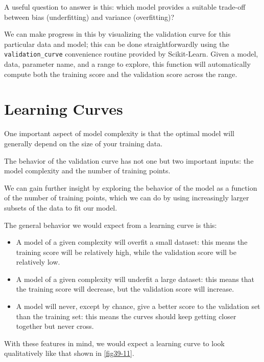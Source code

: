 A useful question to answer is this: which model provides a suitable trade-off between bias (underfitting) and
variance (overfitting)?

We can make progress in this by visualizing the validation curve for this particular
data and model; this can be done straightforwardly using the \verb|validation_curve| convenience routine provided by Scikit-Learn. Given a model, data, parameter name,
and a range to explore, this function will automatically compute both the training
score and the validation score across the range.

\section{Learning Curves}
One important aspect of model complexity is that the optimal model will generally
depend on the size of your training data.

The behavior of the validation curve has not one but two important inputs: the
model complexity and the number of training points.

We can gain further insight by
exploring the behavior of the model as a function of the number of training points,
which we can do by using increasingly larger subsets of the data to fit our model. 

The general behavior we would expect from a learning curve is this:
\begin{itemize}
      \item A model of a given complexity will overfit a small dataset: this means the training
            score will be relatively high, while the validation score will be relatively low.
      \item A model of a given complexity will underfit a large dataset: this means that the
            training score will decrease, but the validation score will increase.
      \item A model will never, except by chance, give a better score to the validation set than
            the training set: this means the curves should keep getting closer together but
            never cross.
\end{itemize}

With these features in mind, we would expect a learning curve to look qualitatively
like that shown in \autoref{fig39-11}.

